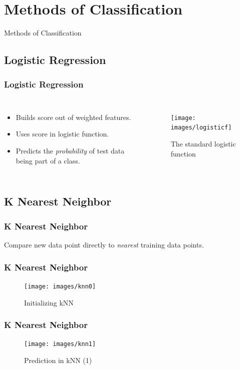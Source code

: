 \section{Methods of Classification}
\begin{frame}
	\begin{center}
	\Large{Methods of Classification}
	\end{center}
\end{frame}

\subsection{Logistic Regression}

\begin{frame}
	\frametitle{Logistic Regression}
	\begin{columns}
	\begin{itemize}
		\item Builds score out of weighted features.
		\item Uses score in logistic function.
		\item Predicts the \emph{probability} of test data being part of a class.
	\end{itemize}
	\begin{figure}
	\texttt{[image: images/logisticf]}
	\caption{\raggedleft The standard logistic function \cite{logfuWiki}}
	\end{figure}
	\end{columns}
\end{frame}

\subsection{K Nearest Neighbor}

\begin{frame}
	\frametitle{K Nearest Neighbor}
	Compare new data point directly to \emph{nearest} training data points.
\end{frame}

\begin{frame}
	\frametitle{K Nearest Neighbor}
	\begin{figure}
	\texttt{[image: images/knn0]}
	\caption{Initializing kNN}
	\end{figure}
\end{frame}

\begin{frame}
	\frametitle{K Nearest Neighbor}
	\begin{figure}
	\texttt{[image: images/knn1]}
	\caption{Prediction in kNN (1)}
	\end{figure}
\end{frame}

